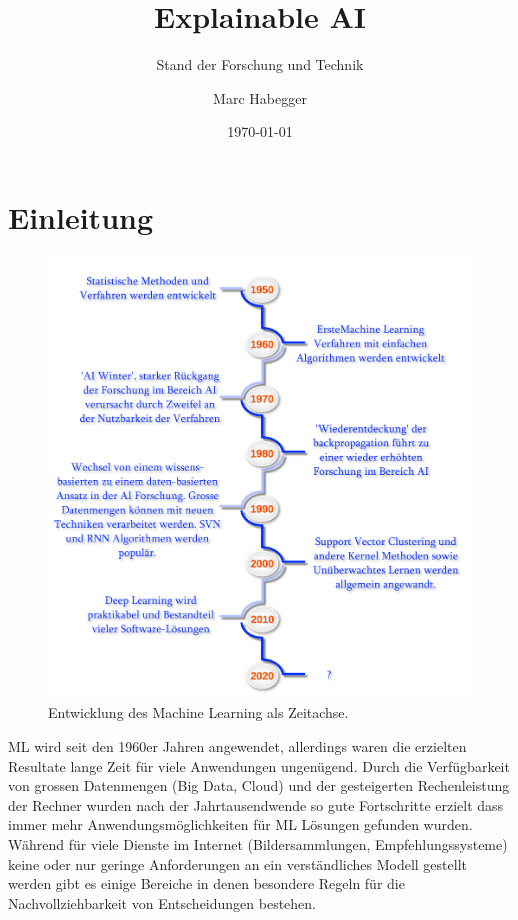 \documentclass[
  12pt, %
  a4paper, %
  oneside, %
  openany, 
  numbers=noenddot, %
  BCOR=5mm, %
  parskip=half*, %
  thesis, %
]{bfhbook}
\author{Marc Habegger}
\title{Explainable AI}
\subtitle{Stand der Forschung und Technik}
\date{\today} %
\begin{document}
                         
\maketitle

\tableofcontents
\sloppy
\mainmatter %

\chapter{Einleitung}
\begin{figure}[ht]
\centering
	\includegraphics[width=\textwidth]{Bilder/ML-Timeline.png}
	\caption{Entwicklung des Machine Learning als Zeitachse.}
\end{figure}
\gls{ML} wird seit den 1960er Jahren angewendet, allerdings waren die erzielten Resultate lange Zeit für viele Anwendungen ungenügend. Durch die Verfügbarkeit von grossen Datenmengen (Big Data, Cloud) und der gesteigerten Rechenleistung der Rechner wurden nach der Jahrtausendwende so gute Fortschritte erzielt dass immer mehr Anwendungsmöglichkeiten für \gls{ML} Lösungen gefunden wurden. Während für viele Dienste im Internet (Bildersammlungen, Empfehlungssysteme) keine oder nur geringe Anforderungen an ein verständliches Modell gestellt werden gibt es einige Bereiche in denen besondere Regeln für die Nachvollziehbarkeit von Entscheidungen bestehen.
\end{document}
